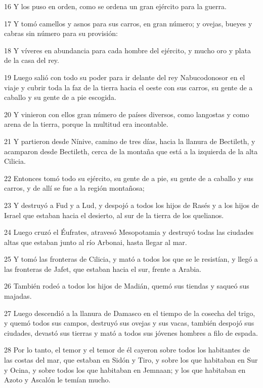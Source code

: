 \par 16 Y los puso en orden, como se ordena un gran ejército para la guerra.
\par 17 Y tomó camellos y asnos para sus carros, en gran número; y ovejas, bueyes y cabras sin número para su provisión:
\par 18 Y víveres en abundancia para cada hombre del ejército, y mucho oro y plata de la casa del rey.
\par 19 Luego salió con todo su poder para ir delante del rey Nabucodonosor en el viaje y cubrir toda la faz de la tierra hacia el oeste con sus carros, su gente de a caballo y su gente de a pie escogida.
\par 20 Y vinieron con ellos gran número de países diversos, como langostas y como arena de la tierra, porque la multitud era incontable.
\par 21 Y partieron desde Nínive, camino de tres días, hacia la llanura de Bectileth, y acamparon desde Bectileth, cerca de la montaña que está a la izquierda de la alta Cilicia.
\par 22 Entonces tomó todo su ejército, su gente de a pie, su gente de a caballo y sus carros, y de allí se fue a la región montañosa;
\par 23 Y destruyó a Fud y a Lud, y despojó a todos los hijos de Rasés y a los hijos de Israel que estaban hacia el desierto, al sur de la tierra de los quelianos.
\par 24 Luego cruzó el Éufrates, atravesó Mesopotamia y destruyó todas las ciudades altas que estaban junto al río Arbonai, hasta llegar al mar.
\par 25 Y tomó las fronteras de Cilicia, y mató a todos los que se le resistían, y llegó a las fronteras de Jafet, que estaban hacia el sur, frente a Arabia.
\par 26 También rodeó a todos los hijos de Madián, quemó sus tiendas y saqueó sus majadas.
\par 27 Luego descendió a la llanura de Damasco en el tiempo de la cosecha del trigo, y quemó todos sus campos, destruyó sus ovejas y sus vacas, también despojó sus ciudades, devastó sus tierras y mató a todos sus jóvenes hombres a filo de espada.
\par 28 Por lo tanto, el temor y el temor de él cayeron sobre todos los habitantes de las costas del mar, que estaban en Sidón y Tiro, y sobre los que habitaban en Sur y Ocina, y sobre todos los que habitaban en Jemnaan; y los que habitaban en Azoto y Ascalón le temían mucho.

